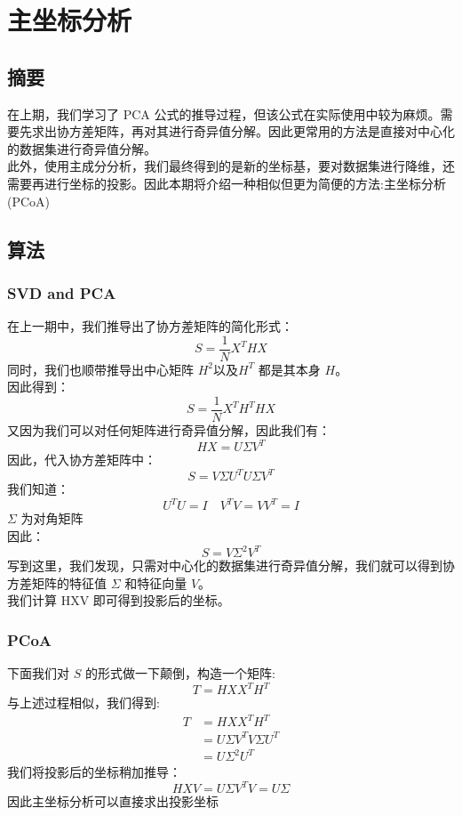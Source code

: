 \documentclass{report}
\begin{document}
\chapter{主坐标分析}
\section{摘要}
在上期，我们学习了 PCA 公式的推导过程，但该公式在实际使用中较为麻烦。需要先求出协方差矩阵，再对其进行奇异值分解。因此更常用的方法是直接对中心化的数据集进行奇异值分解。\\
此外，使用主成分分析，我们最终得到的是新的坐标基，要对数据集进行降维，还需要再进行坐标的投影。因此本期将介绍一种相似但更为简便的方法:主坐标分析 (PCoA)
\section{算法}
\subsection{SVD and PCA}
在上一期中，我们推导出了协方差矩阵的简化形式：
$$
S=\frac{1}{N} X^T H X
$$
同时，我们也顺带推导出中心矩阵 $H^2以及H^T$ 都是其本身 $H$。\\
因此得到：
$$
S=\frac{1}{N} X^T H^T H X
$$
又因为我们可以对任何矩阵进行奇异值分解，因此我们有：
$$
HX = U \Sigma V^T
$$
因此，代入协方差矩阵中：
$$
S = V \Sigma U^T U \Sigma V^T
$$
我们知道：
$$
U^T U=I \quad V^T V = V V^T= I
$$
$\Sigma$ 为对角矩阵\\
因此：
$$
S=V\Sigma ^2 V^T
$$
写到这里，我们发现，只需对中心化的数据集进行奇异值分解，我们就可以得到协方差矩阵的特征值 $\Sigma$ 和特征向量 $V$。\\
我们计算 HXV 即可得到投影后的坐标。
\subsection{PCoA}
下面我们对 $S$ 的形式做一下颠倒，构造一个矩阵:
$$
T=HXX^TH^T
$$
与上述过程相似，我们得到:
$$
\begin{aligned}
T&=HXX^TH^T\\
&=U\Sigma V^T V\Sigma U^T\\
&=U\Sigma^2 U^T
\end{aligned}
$$
我们将投影后的坐标稍加推导：
$$
HXV=U\Sigma V^TV=U\Sigma
$$
因此主坐标分析可以直接求出投影坐标
\end{document}
